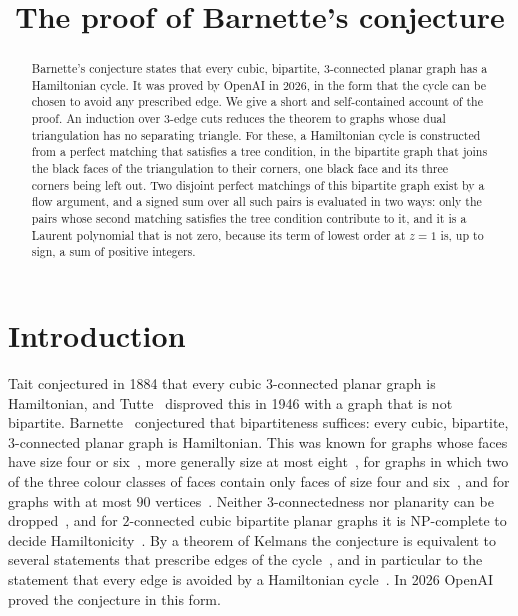 \documentclass[a4paper]{amsart}
\title{The proof of Barnette's conjecture}
\author{}
\numberwithin{equation}{section}
\theoremstyle{definition}
\begin{document}
\begin{abstract}
Barnette's conjecture states that every cubic, bipartite, $3$-connected planar graph has a Hamiltonian cycle.
It was proved by OpenAI in 2026, in the form that the cycle can be chosen to avoid any prescribed edge.
We give a short and self-contained account of the proof.
An induction over $3$-edge cuts reduces the theorem to graphs whose dual triangulation has no separating triangle.
For these, a Hamiltonian cycle is constructed from a perfect matching that satisfies a tree condition, in the bipartite graph that joins the black faces of the triangulation to their corners, one black face and its three corners being left out.
Two disjoint perfect matchings of this bipartite graph exist by a flow argument, and a signed sum over all such pairs is evaluated in two ways: only the pairs whose second matching satisfies the tree condition contribute to it, and it is a Laurent polynomial that is not zero, because its term of lowest order at $z=1$ is, up to sign, a sum of positive integers.
\end{abstract}

\maketitle

\section{Introduction}

Tait conjectured in 1884 that every cubic $3$-connected planar graph is Hamiltonian, and Tutte~\cite{Tutte} disproved this in 1946 with a graph that is not bipartite.
Barnette~\cite{Barnette} conjectured that bipartiteness suffices: every cubic, bipartite, $3$-connected planar graph is Hamiltonian.
This was known for graphs whose faces have size four or six~\cite{Goodey}, more generally size at most eight~\cite{Schnieders}, for graphs in which two of the three colour classes of faces contain only faces of size four and six~\cite{FederSubi}, and for graphs with at most $90$ vertices~\cite{HMM,BGM}.
Neither $3$-connectedness nor planarity can be dropped~\cite{AEHS,Georges}, and for $2$-connected cubic bipartite planar graphs it is NP-complete to decide Hamiltonicity~\cite{ANS}.
By a theorem of Kelmans the conjecture is equivalent to several statements that prescribe edges of the cycle~\cite[Theorem~8]{Alt}, and in particular to the statement that every edge is avoided by a Hamiltonian cycle~\cite[Corollary~3]{Hertel}.
In 2026 OpenAI~\cite{OpenAI} proved the conjecture in this form.
\end{document}

